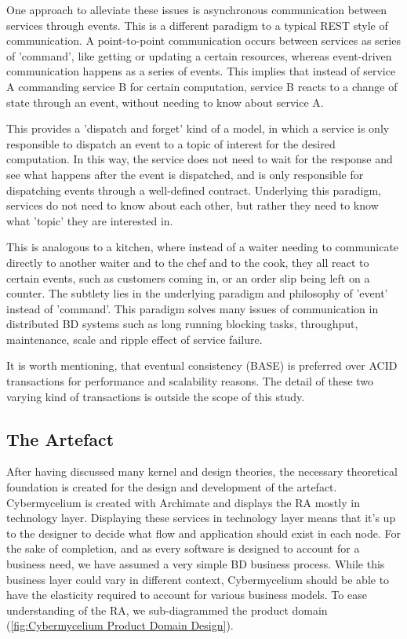 \documentclass[review]{elsarticle}
\begin{document}
One approach to alleviate these issues is asynchronous communication between services through events. This is a different paradigm to a typical REST style of communication. A point-to-point communication occurs between services as series of 'command', like getting or updating a certain resources, whereas event-driven communication happens as a series of events. This implies that instead of service A commanding service B for certain computation, service B reacts to a change of state through an event, without needing to know about service A.

This provides a 'dispatch and forget' kind of a model, in which a service is only responsible to dispatch an event to a topic of interest for the desired computation. In this way, the service does not need to wait for the response and see what happens after the event is dispatched, and is only responsible for dispatching events through a well-defined contract. Underlying this paradigm, services do not need to know about each other, but rather they need to know what 'topic' they are interested in.

This is analogous to a kitchen, where instead of a waiter needing to communicate directly to another waiter and to the chef and to the cook, they all react to certain events, such as customers coming in, or an order slip being left on a counter. The subtlety lies in the underlying paradigm and philosophy of 'event' instead of 'command'. This paradigm solves many issues of communication in distributed BD systems such as long running blocking tasks, throughput, maintenance, scale and ripple effect of service failure.

It is worth mentioning, that eventual consistency (BASE) is preferred over ACID transactions for performance and scalability reasons. The detail of these two varying kind of transactions is outside the scope of this study.

\subsection{The Artefact} \label{the-artifact}

After having discussed many kernel and design theories, the necessary theoretical foundation is created for the design and development of the artefact. Cybermycelium is created with Archimate and displays the RA mostly in technology layer. Displaying these services in technology layer means that it's up to the designer to decide what flow and application should exist in each node. For the sake of completion, and as every software is designed to account for a business need, we have assumed a very simple BD business process. While this business layer could vary in different context, Cybermycelium should be able to have the elasticity required to account for various business models. To ease understanding of the RA, we sub-diagrammed the product domain (\ref{fig:Cybermycelium Product Domain Design}).
\end{document}
